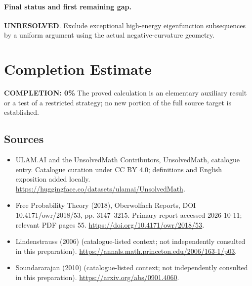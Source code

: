 \documentclass[11pt]{article}
\begin{document}
\paragraph{Final status and first remaining gap.}
\textbf{UNRESOLVED}. Exclude exceptional high-energy eigenfunction subsequences by a uniform argument using the actual negative-curvature geometry.

\section{Completion Estimate}
\noindent\textbf{COMPLETION: 0\%}
The proved calculation is an elementary auxiliary result or a test of a restricted strategy; no new portion of the full source target is established.

\subsection{Sources}
\begin{itemize}
\item[\hypertarget{source:statement:1}{S1}] ULAM.AI and the UnsolvedMath Contributors, UnsolvedMath, catalogue entry. Catalogue curation under CC BY 4.0; definitions and English exposition added locally.
\url{https://huggingface.co/datasets/ulamai/UnsolvedMath}.
\item[\hypertarget{source:statement:2}{S2}] Free Probability Theory (2018), Oberwolfach Reports, DOI 10.4171/owr/2018/53, pp. 3147--3215. Primary report accessed 2026-10-11; relevant PDF pages 55.
\url{https://doi.org/10.4171/owr/2018/53}.
\item[\hypertarget{source:statement:3}{S3}] Lindenstrauss (2006) (catalogue-listed context; not independently consulted in this preparation).
\url{https://annals.math.princeton.edu/2006/163-1/p03}.
\item[\hypertarget{source:statement:4}{S4}] Soundararajan (2010) (catalogue-listed context; not independently consulted in this preparation).
\url{https://arxiv.org/abs/0901.4060}.
\end{itemize}
\label{end:statement}
\end{document}

